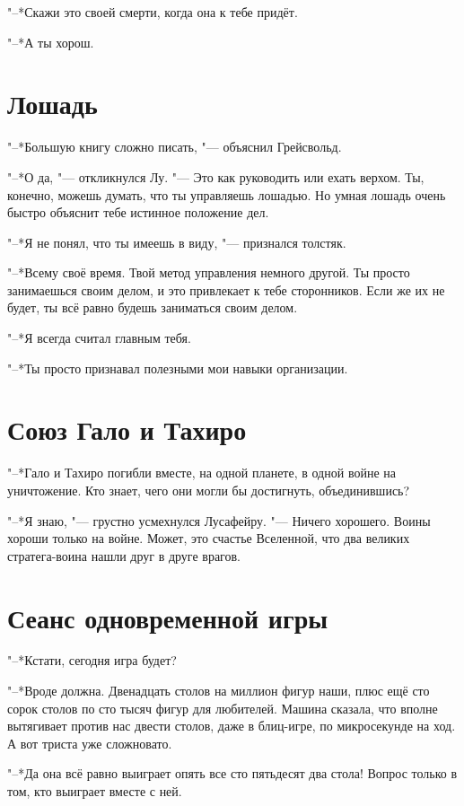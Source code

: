 "--*Скажи это своей смерти, когда она к тебе придёт.

"--*А ты хорош.

\section{Лошадь}

"--*Большую книгу сложно писать, "--- объяснил Грейсвольд.

"--*О да, "--- откликнулся Лу.
 "--- Это как руководить или ехать верхом.
Ты, конечно, можешь думать, что ты управляешь лошадью.
Но умная лошадь очень быстро объяснит тебе истинное положение дел.

"--*Я не понял, что ты имеешь в виду, "--- признался толстяк.

"--*Всему своё время.
Твой метод управления немного другой.
Ты просто занимаешься своим делом, и это привлекает к тебе сторонников.
Если же их не будет, ты всё равно будешь заниматься своим делом.

"--*Я всегда считал главным тебя.

"--*Ты просто признавал полезными мои навыки организации.

\section{Союз Гало и Тахиро}

"--*Гало и Тахиро погибли вместе, на одной планете, в одной войне на уничтожение.
Кто знает, чего они могли бы достигнуть, объединившись?

"--*Я знаю, "--- грустно усмехнулся Лусафейру.
"--- Ничего хорошего.
Воины хороши только на войне.
Может, это счастье Вселенной, что два великих стратега-воина нашли друг в друге врагов.

\section{Сеанс одновременной игры}

"--*Кстати, сегодня игра будет?

"--*Вроде должна.
Двенадцать столов на миллион фигур наши, плюс ещё сто сорок столов по сто тысяч фигур для любителей.
Машина сказала, что вполне вытягивает против нас двести столов, даже в блиц-игре, по микросекунде на ход.
А вот триста уже сложновато.

"--*Да она всё равно выиграет опять все сто пятьдесят два стола!
Вопрос только в том, кто выиграет вместе с ней.

